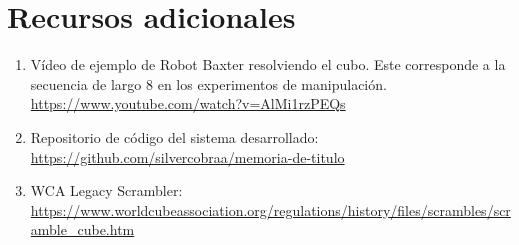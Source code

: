 \newpage
\newpage
\section*{Recursos adicionales}

\begin{enumerate}
	\item Vídeo de ejemplo de Robot Baxter resolviendo el cubo. Este corresponde a la secuencia de largo 8 en los experimentos de manipulación.
	\url{https://www.youtube.com/watch?v=AlMi1rzPEQs}
	\item Repositorio de código del sistema desarrollado: \url{https://github.com/silvercobraa/memoria-de-titulo}
	\item WCA Legacy Scrambler: \url{https://www.worldcubeassociation.org/regulations/history/files/scrambles/scramble_cube.htm}
\end{enumerate}
